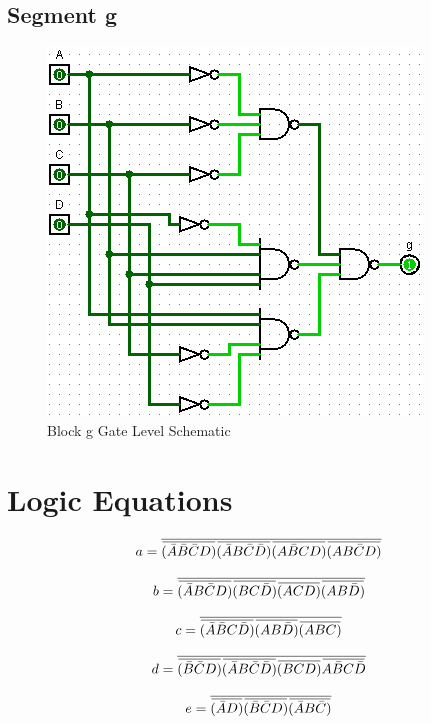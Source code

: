 \documentclass[12pt]{article}
\newcommand{\overbar}[1]{\mkern 1.5mu\overline{\mkern-1.5mu#1\mkern-1.5mu}\mkern 1.5mu} %
\begin{document}
\subsection{Segment g}
\begin{figure}[H]
	\centering
	\label{fig:gBlockGates}
	\includegraphics[width=0.65\linewidth, keepaspectratio]{g_logicCkt}
	\caption{Block g Gate Level Schematic}
\end{figure}


\newpage
\section{Logic Equations}
\label{app:logicEquations}
\begin{equation}
a = \overline{\overbar{(\bar{A}\bar{B}\bar{C}D)}\overbar{(\bar{A}B\bar{C}\bar{D})}\overbar{(A\bar{B}CD)}\overbar{(AB\bar{C}D)}}
\end{equation}

\begin{equation}
b = \overline{\overbar{(\bar{A}B\bar{C}D)}\overbar{(BC\bar{D})}\overbar{(ACD)}\overbar{(AB\bar{D})}}
\end{equation}

\begin{equation}
c = \overline{\overbar{(\bar{A}\bar{B}C\bar{D})}\overbar{(AB\bar{D})}\overbar{(ABC)}}
\end{equation}

\begin{equation}
d = \overline{\overbar{(\bar{B}\bar{C}D)}\overbar{(\bar{A}B\bar{C}\bar{D})}\overbar{(BCD)}\overbar{A\bar{B}C\bar{D}}}
\end{equation}

\begin{equation}
e = \overline{\overbar{(\bar{A}D)}\overbar{(\bar{B}\bar{C}D)}\overbar{(\bar{A}B\bar{C})}}
\end{equation}
\end{document}
